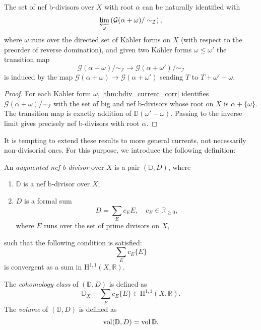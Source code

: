 \begin{corollary}\label{cor:nef_b_degenerate_1}
    The set of nef b-divisors over $X$ with root $\alpha$ can be naturally identified with
    \[
    \varprojlim_{\omega} \left( \mathcal{G}(\alpha+\omega)/\sim_{\mathcal{I}} \right),
    \]
    where $\omega$ runs over the directed set of Kähler forms on $X$ (with respect to the preorder of reverse domination), and given two Kähler forms $\omega\leq \omega'$ the transition map
    \[
    \mathcal{G}(\alpha+\omega)/\sim_{\mathcal{I}}\rightarrow \mathcal{G}(\alpha+\omega')/\sim_{\mathcal{I}}
    \]
    is induced by the map $\mathcal{G}(\alpha+\omega)\rightarrow \mathcal{G}(\alpha+\omega')$ sending $T$ to $T+\omega'-\omega$.
\end{corollary}
\begin{proof}
For each Kähler form $\omega$, \cref{thm:bdiv_current_corr} identifies $\mathcal G(\alpha+\omega)/\sim_{\mathcal I}$ with the set of big and nef b-divisors whose root on $X$ is $\alpha+\{\omega\}$. The transition map is exactly addition of $\mathbb D(\omega'-\omega)$. Passing to the inverse limit  gives precisely nef b-divisors with root $\alpha$.
\end{proof}

It is tempting to extend these results to more general currents, not necessarily non-divisorial ones. For this purpose, we introduce the following definition:
\begin{definition}\label{def:augmented_nefb}
    An \emph{augmented nef b-divisor} over $X$ is a pair $(\mathbb{D},D)$, where
    \begin{enumerate}
        \item\label{itm:def:augmented_nefb:1} $\mathbb{D}$ is a nef b-divisor over $X$;
        \item\label{itm:def:augmented_nefb:2} $D$ is a formal sum
        \[
        D=\sum_{E} c_E E,\quad c_E\in \mathbb{R}_{\geq 0},
        \]
        where $E$ runs over the set of prime divisors on $X$,
    \end{enumerate}
    such that the following condition is satisfied:
    \[
    \sum_{E}c_E \{E\}
    \]
    is convergent as a sum in $\mathrm{H}^{1,1}(X,\mathbb{R})$.

    The \emph{cohomology class} of $(\mathbb{D},D)$ is defined as
    \[
    \mathbb{D}_X+\sum_{E}c_E \{E\}\in \mathrm{H}^{1,1}(X,\mathbb{R}).
    \]
    The \emph{volume} of $(\mathbb{D},D)$ is defined as
    \[
    \operatorname{vol} (\mathbb{D},D)=\operatorname{vol} \mathbb{D}.
    \]
\end{definition}

